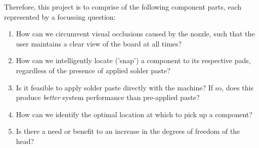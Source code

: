 \documentclass [11pt]{article}
\begin{document}
Therefore, this project is to comprise of the following component parts, each represented by a focussing question:
\begin{enumerate}
	\item How can we circumvent visual occlusions caused by the nozzle, such that the user maintains a clear view of the board at all times?
	\item How can we intelligently locate ('snap') a component to its respective pads, regardless of the presence of applied solder paste?
	\item Is it feasible to apply solder paste directly with the machine? If so, does this produce \emph{better} system performance than pre-applied paste?
	\item How can we identify the optimal location at which to pick up a component?
	\item Is there a need or benefit to an increase in the degrees of freedom of the head?
\end{enumerate}

\nocite{*}


\end{document}

